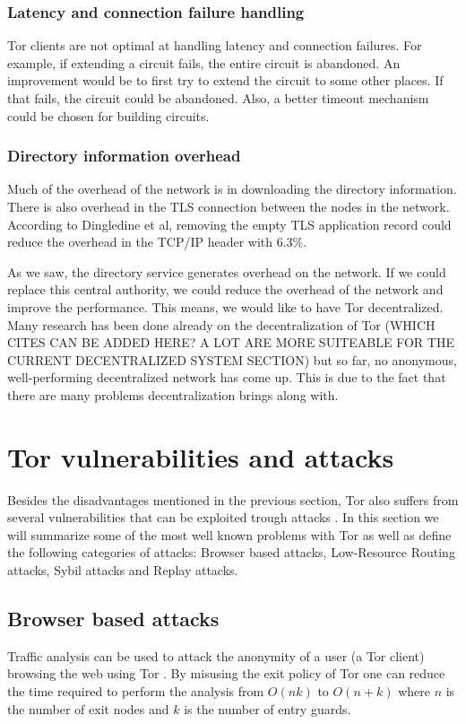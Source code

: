\documentclass{article}
\begin{document}
		\subsubsection{Latency and connection failure handling}
		Tor clients are not optimal at handling latency and connection failures. For example, if extending a circuit fails, the entire circuit is abandoned. An improvement would be to first try to extend the circuit to some other places. If that fails, the circuit could be abandoned. Also, a better timeout mechanism could be chosen for building circuits.		
		
		\subsubsection{Directory information overhead}
		Much of the overhead of the network is in downloading the directory information. There is also overhead in the TLS connection between the nodes in the network. According to Dingledine et al, removing the empty TLS application record could reduce the overhead in the TCP/IP header with 6.3\%.
		
		As we saw, the directory service generates overhead on the network. If we could replace this central authority, we could reduce the overhead of the network and improve the performance. This means, we would like to have Tor decentralized. Many research has been done already on the decentralization of Tor \cite{wang2012octopus, alsabah2013pctcp} (WHICH CITES CAN BE ADDED HERE? A LOT ARE MORE SUITEABLE FOR THE CURRENT DECENTRALIZED SYSTEM SECTION) but so far, no anonymous, well-performing decentralized network has come up. This is due to the fact that there are many problems decentralization brings along with.
		
\section{Tor vulnerabilities and attacks}
	\label{sec:attacks}
	
	Besides the disadvantages mentioned in the previous section, Tor also suffers from several vulnerabilities that can be exploited trough attacks \cite{abbott2007browser, douceur2002sybil, bauer2007low}. In this section we will summarize some of the most well known problems with Tor as well as define the following categories of attacks: Browser based attacks, Low-Resource Routing attacks, Sybil attacks and Replay attacks.

	\subsection{Browser based attacks}
		Traffic analysis can be used to attack the anonymity of a user (a Tor client) browsing the web using Tor \cite{abbott2007browser}. By misusing the exit policy of Tor one can reduce the time required to perform the analysis from $O(nk)$ to $O(n+k)$ where $n$ is the number of exit nodes and $k$ is the number of entry guards.\\
\end{document}
